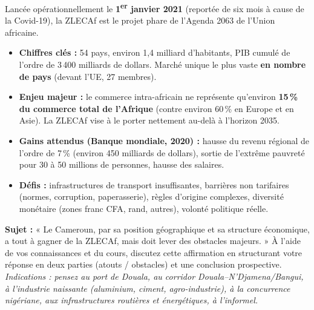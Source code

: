 \documentclass[11pt]{article}
\begin{document}
\begin{savaistu}
Lancée opérationnellement le \textbf{1\textsuperscript{er} janvier 2021} (reportée de six mois à cause de la Covid-19), la ZLECAf est le projet phare de l'Agenda 2063 de l'Union africaine.
\begin{itemize}
    \item \textbf{Chiffres clés :} 54 pays, environ 1,4 milliard d'habitants, PIB cumulé de l'ordre de 3\,400 milliards de dollars. Marché unique le plus vaste \textbf{en nombre de pays} (devant l'UE, 27 membres).
    \item \textbf{Enjeu majeur :} le commerce intra-africain ne représente qu'environ \textbf{15\,\% du commerce total de l'Afrique} (contre environ 60\,\% en Europe et en Asie). La ZLECAf vise à le porter nettement au-delà à l'horizon 2035.
    \item \textbf{Gains attendus (Banque mondiale, 2020) :} hausse du revenu régional de l'ordre de 7\,\% (environ 450 milliards de dollars), sortie de l'extrême pauvreté pour 30 à 50 millions de personnes, hausse des salaires.
    \item \textbf{Défis :} infrastructures de transport insuffisantes, barrières non tarifaires (normes, corruption, paperasserie), règles d'origine complexes, diversité monétaire (zones franc CFA, rand, autres), volonté politique réelle.
\end{itemize}
\end{savaistu}

\begin{exercice}
\textbf{Sujet :} « Le Cameroun, par sa position géographique et sa structure économique, a tout à gagner de la ZLECAf, mais doit lever des obstacles majeurs. »
À l'aide de vos connaissances et du cours, discutez cette affirmation en structurant votre réponse en deux parties (atouts / obstacles) et une conclusion prospective.
\textit{Indications : pensez au port de Douala, au corridor Douala--N'Djamena/Bangui, à l'industrie naissante (aluminium, ciment, agro-industrie), à la concurrence nigériane, aux infrastructures routières et énergétiques, à l'informel.}
\end{exercice}
\end{document}

